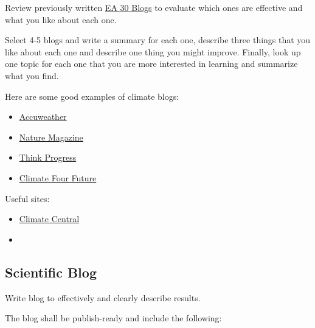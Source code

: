 \documentclass{article}\usepackage[]{graphicx}\usepackage[]{color}
\begin{document}
Review previously written \href{https://marclos.github.io/Climate_Change_Narratives/}{EA 30 Blogs} to evaluate which ones are effective and what you like about each one. 

Select 4-5 blogs and write a summary for each one, describe three things that you like about each one and describe one thing you might improve. Finally, look up one topic for each one that you are more interested in learning and summarize what you find.

Here are some good examples of climate blogs:

\begin{itemize}
  \item \href{http://www.accuweather.com/en/weather-blogs/climatechange}{Accuweather}
  \item \href{http://blogs.nature.com/climatefeedback/}{Nature Magazine}
  \item \href{https://thinkprogress.org/tagged/climate}{Think Progress}
  \item \href{http://climateofourfuture.org/}{Climate Four Future}
\end{itemize}

Useful sites: 

\begin{itemize}
  \item \href{http://www.climatecentral.org/news/the-heat-is-on}{Climate Central}
  \item 
\end{itemize}


\subsection{Scientific Blog}

Write blog to effectively and clearly describe results.

The blog shall be publish-ready and include the following: 
\end{document}
